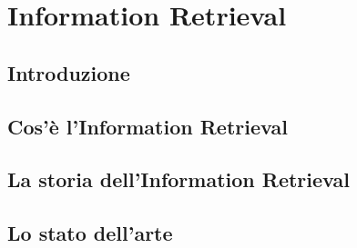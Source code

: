 \chapter{Information Retrieval}
\label{Information_Retrieval}
\section{Introduzione}
\label{Information_Retrieval:Introduzione}
\section{Cos'è l'Information Retrieval}
\section{La storia dell'Information Retrieval}
\section{Lo stato dell'arte}